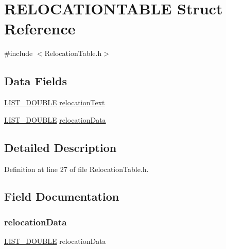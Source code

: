 \hypertarget{struct_r_e_l_o_c_a_t_i_o_n_t_a_b_l_e}{}\section{R\+E\+L\+O\+C\+A\+T\+I\+O\+N\+T\+A\+B\+LE Struct Reference}
\label{struct_r_e_l_o_c_a_t_i_o_n_t_a_b_l_e}


{\ttfamily \#include $<$Relocation\+Table.\+h$>$}

\subsection*{Data Fields}
\begin{DoxyCompactItemize}
\item 
\mbox{\hyperlink{_double_list_generic_8h_a1e5b384fadfbaaa8da74a3c3212fae13}{L\+I\+S\+T\+\_\+\+D\+O\+U\+B\+LE}} \mbox{\hyperlink{struct_r_e_l_o_c_a_t_i_o_n_t_a_b_l_e_a64feab00683ccf2635243aa94f497f76}{relocation\+Text}}
\item 
\mbox{\hyperlink{_double_list_generic_8h_a1e5b384fadfbaaa8da74a3c3212fae13}{L\+I\+S\+T\+\_\+\+D\+O\+U\+B\+LE}} \mbox{\hyperlink{struct_r_e_l_o_c_a_t_i_o_n_t_a_b_l_e_aa7b93b1135be0a7a0370f454060ad890}{relocation\+Data}}
\end{DoxyCompactItemize}


\subsection{Detailed Description}


Definition at line 27 of file Relocation\+Table.\+h.



\subsection{Field Documentation}
\mbox{\label{struct_r_e_l_o_c_a_t_i_o_n_t_a_b_l_e_aa7b93b1135be0a7a0370f454060ad890}} 
\subsubsection{\texorpdfstring{relocation\+Data}{relocationData}}
{\footnotesize\ttfamily \mbox{\hyperlink{_double_list_generic_8h_a1e5b384fadfbaaa8da74a3c3212fae13}{L\+I\+S\+T\+\_\+\+D\+O\+U\+B\+LE}} relocation\+Data}



